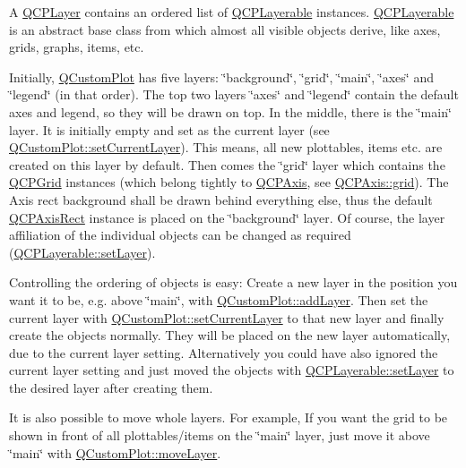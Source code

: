 A \hyperlink{class_q_c_p_layer}{Q\+C\+P\+Layer} contains an ordered list of \hyperlink{class_q_c_p_layerable}{Q\+C\+P\+Layerable} instances. \hyperlink{class_q_c_p_layerable}{Q\+C\+P\+Layerable} is an abstract base class from which almost all visible objects derive, like axes, grids, graphs, items, etc.

Initially, \hyperlink{class_q_custom_plot}{Q\+Custom\+Plot} has five layers\+: \char`\"{}background\char`\"{}, \char`\"{}grid\char`\"{}, \char`\"{}main\char`\"{}, \char`\"{}axes\char`\"{} and \char`\"{}legend\char`\"{} (in that order). The top two layers \char`\"{}axes\char`\"{} and \char`\"{}legend\char`\"{} contain the default axes and legend, so they will be drawn on top. In the middle, there is the \char`\"{}main\char`\"{} layer. It is initially empty and set as the current layer (see \hyperlink{class_q_custom_plot_a73a6dc47c653bb6f8f030abca5a11852}{Q\+Custom\+Plot\+::set\+Current\+Layer}). This means, all new plottables, items etc. are created on this layer by default. Then comes the \char`\"{}grid\char`\"{} layer which contains the \hyperlink{class_q_c_p_grid}{Q\+C\+P\+Grid} instances (which belong tightly to \hyperlink{class_q_c_p_axis}{Q\+C\+P\+Axis}, see \hyperlink{class_q_c_p_axis_ac4fb913cce3072b5e75a4635e0f6cd04}{Q\+C\+P\+Axis\+::grid}). The Axis rect background shall be drawn behind everything else, thus the default \hyperlink{class_q_c_p_axis_rect}{Q\+C\+P\+Axis\+Rect} instance is placed on the \char`\"{}background\char`\"{} layer. Of course, the layer affiliation of the individual objects can be changed as required (\hyperlink{class_q_c_p_layerable_ab0d0da6d2de45a118886d2c8e16d5a54}{Q\+C\+P\+Layerable\+::set\+Layer}).

Controlling the ordering of objects is easy\+: Create a new layer in the position you want it to be, e.\+g. above \char`\"{}main\char`\"{}, with \hyperlink{class_q_custom_plot_ad5255393df078448bb6ac83fa5db5f52}{Q\+Custom\+Plot\+::add\+Layer}. Then set the current layer with \hyperlink{class_q_custom_plot_a73a6dc47c653bb6f8f030abca5a11852}{Q\+Custom\+Plot\+::set\+Current\+Layer} to that new layer and finally create the objects normally. They will be placed on the new layer automatically, due to the current layer setting. Alternatively you could have also ignored the current layer setting and just moved the objects with \hyperlink{class_q_c_p_layerable_ab0d0da6d2de45a118886d2c8e16d5a54}{Q\+C\+P\+Layerable\+::set\+Layer} to the desired layer after creating them.

It is also possible to move whole layers. For example, If you want the grid to be shown in front of all plottables/items on the \char`\"{}main\char`\"{} layer, just move it above \char`\"{}main\char`\"{} with \hyperlink{class_q_custom_plot_ae896140beff19424e9e9e02d6e331104}{Q\+Custom\+Plot\+::move\+Layer}.


